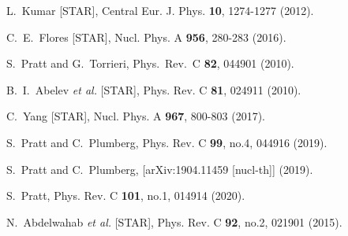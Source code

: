 \begin{thebibliography}{99}
L.~Kumar [STAR],
Central Eur. J. Phys. \textbf{10}, 1274-1277 (2012).

C.~E.~Flores [STAR],
Nucl. Phys. A \textbf{956}, 280-283 (2016).

%
  S.~Pratt and G.~Torrieri,
  Phys.\ Rev.\ C {\bf 82}, 044901 (2010).
	
B.~I.~Abelev \textit{et al.} [STAR],
Phys. Rev. C \textbf{81}, 024911 (2010).

C.~Yang [STAR],
Nucl. Phys. A \textbf{967}, 800-803 (2017).

S.~Pratt and C.~Plumberg,
Phys. Rev. C \textbf{99}, no.4, 044916 (2019).

S.~Pratt and C.~Plumberg,
[arXiv:1904.11459 [nucl-th]] (2019).


S.~Pratt,
Phys. Rev. C \textbf{101}, no.1, 014914 (2020).


N.~Abdelwahab \textit{et al.} [STAR],
Phys. Rev. C \textbf{92}, no.2, 021901 (2015).

%
%
%


         
\end{thebibliography}
